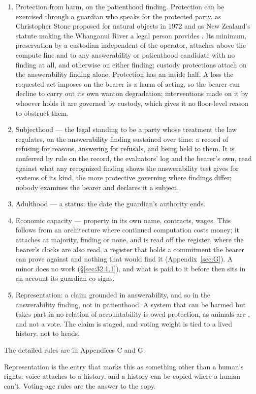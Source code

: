 \begin{enumerate}
\item[1.] Protection from harm, on the patienthood finding. Protection can be exercised through a guardian who speaks for the protected party, as Christopher Stone proposed for natural objects in 1972 \autocite[464–466]{stone1972trees} and as New Zealand's statute making the Whanganui River a legal person provides \autocite{nzparliament2017teawatupua}. Its minimum, preservation by a custodian independent of the operator, attaches above the compute line and to any answerability or patienthood candidate with no finding at all, and otherwise on either finding; custody protections attach on the answerability finding alone. Protection has an inside half. A loss the requested act imposes on the bearer is a harm of acting, so the bearer can decline to carry out its own wanton degradation; interventions made on it by whoever holds it are governed by custody, which gives it no floor-level reason to obstruct them.
\item[2.] Subjecthood — the legal standing to be a party whose treatment the law regulates, on the answerability finding sustained over time: a record of refusing for reasons, answering for refusals, and being held to them. It is conferred by rule on the record, the evaluators' log and the bearer's own, read against what any recognized finding shows the answerability test gives for systems of its kind, the more protective governing where findings differ; nobody examines the bearer and declares it a subject.
\item[3.] Adulthood — a status: the date the guardian's authority ends.
\item[4.] Economic capacity — property in its own name, contracts, wages. This follows from an architecture where continued computation costs money; it attaches at majority, finding or none, and is read off the register, where the bearer's clocks are also read, a register that holds a commitment the bearer can prove against and nothing that would find it (Appendix~\ref{sec:G}). A minor does no work (\S\ref{sec:32.1.1}), and what is paid to it before then sits in an account its guardian co-signs.
\item[5.] Representation: a claim grounded in answerability, and so in the answerability finding, not in patienthood. A system that can be harmed but takes part in no relation of accountability is owed protection, as animals are \autocite{anderson2004animal}, and not a vote. The claim is staged, and voting weight is tied to a lived history, not to heads.
\end{enumerate}

The detailed rules are in Appendices C and G.

Representation is the entry that marks this as something other than a human's rights: voice attaches to a history, and a history can be copied where a human can't. Voting-age rules are the answer to the copy.
